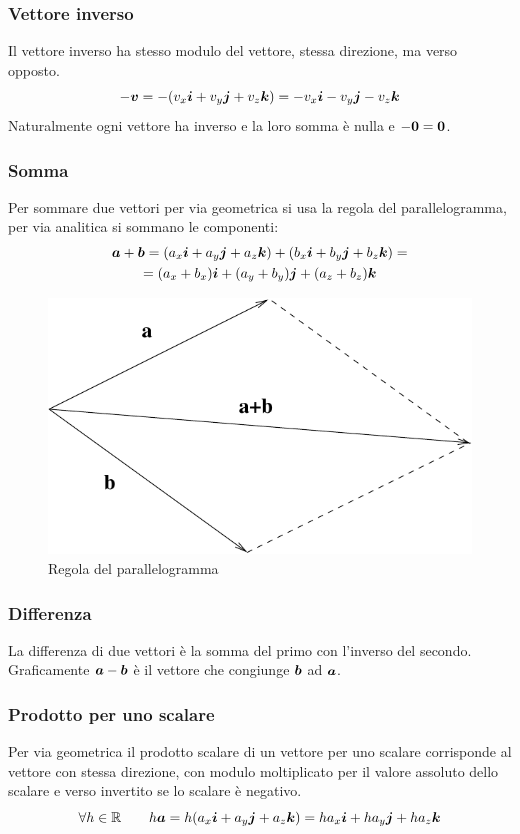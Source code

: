 \subsubsection{Vettore inverso}
Il vettore inverso ha stesso modulo del vettore, stessa direzione,
ma verso opposto.
$$-\boldsymbol{v}=-(v_x\boldsymbol{i}+v_y\boldsymbol{j}+v_z \boldsymbol{k})=-v_x\boldsymbol{i}-v_y\boldsymbol{j}-v_z\boldsymbol{k}$$
Naturalmente ogni vettore ha inverso e la loro somma è nulla e $-\boldsymbol{0}=\boldsymbol{0}$.

\subsubsection{Somma}
Per sommare due vettori per via geometrica si usa la regola del
parallelogramma, per via analitica si sommano le componenti:
\begin{multline*}
\boldsymbol{a}+\boldsymbol{b}=(a_x\boldsymbol{i}+a_y\boldsymbol{j}+a_z \boldsymbol{k})+(b_x\boldsymbol{i}+b_y\boldsymbol{j}+b_z\boldsymbol{k})=\\
=(a_x+b_x)\boldsymbol{i}+(a_y+b_y)\boldsymbol{j}+(a_z+b_z)\boldsymbol{k}
\end{multline*}
\begin{figure}[htbp]
\centering
\includegraphics[scale=0.5]{immagini/fisica1/somma_vettori}
\caption{Regola del parallelogramma}
\end{figure}



\subsubsection{Differenza} La differenza di due
vettori è la somma del primo con l'inverso del secondo. Graficamente $\boldsymbol{a}-\boldsymbol{b}$ è il vettore che congiunge $\boldsymbol{b}$ ad $\boldsymbol{a}$.
\subsubsection{Prodotto per uno scalare}
Per via geometrica il prodotto scalare di un vettore per uno scalare corrisponde al vettore con stessa direzione, con modulo moltiplicato per il valore assoluto dello scalare e verso invertito se lo scalare è negativo.
\begin{equation*}\forall h \in \mathbb{R}\qquad h\boldsymbol{a}=h(a_x\boldsymbol{i}+a_y\boldsymbol{j}+a_z\boldsymbol{k})=ha_x\boldsymbol{i}+ha_y\boldsymbol{j}+ha_z\boldsymbol{k}\end{equation*}
